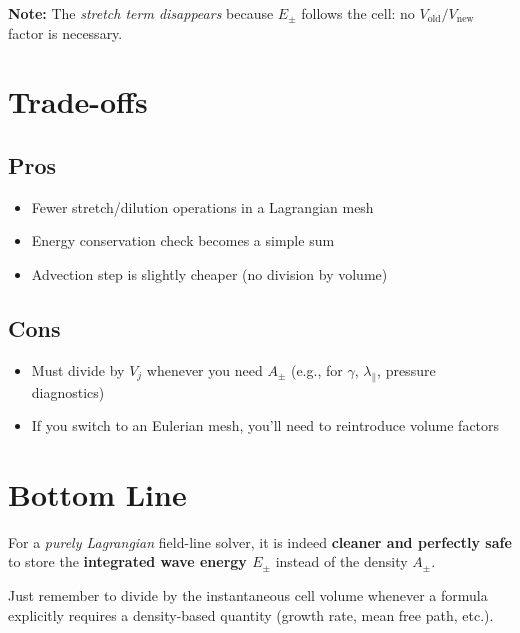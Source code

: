 \noindent \textbf{Note:} The \emph{stretch term disappears} because $E_\pm$ follows the cell:
no $V_{\text{old}} / V_{\text{new}}$ factor is necessary.

\section*{Trade-offs}

\subsection*{Pros}
\begin{itemize}
    \item Fewer stretch/dilution operations in a Lagrangian mesh
    \item Energy conservation check becomes a simple sum
    \item Advection step is slightly cheaper (no division by volume)
\end{itemize}

\subsection*{Cons}
\begin{itemize}
    \item Must divide by $V_j$ whenever you need $A_\pm$ (e.g., for $\gamma$, $\lambda_\parallel$, pressure diagnostics)
    \item If you switch to an Eulerian mesh, you'll need to reintroduce volume factors
\end{itemize}

\section*{Bottom Line}

For a \emph{purely Lagrangian} field-line solver, it is indeed \textbf{cleaner and perfectly safe} to store the \textbf{integrated wave energy $E_\pm$} instead of the density $A_\pm$.

\medskip

\noindent Just remember to divide by the instantaneous cell volume whenever a formula explicitly requires a density-based quantity (growth rate, mean free path, etc.).


